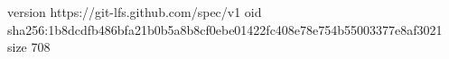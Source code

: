 version https://git-lfs.github.com/spec/v1
oid sha256:1b8dcdfb486bfa21b0b5a8b8cf0ebe01422fc408e78e754b55003377e8af3021
size 708
